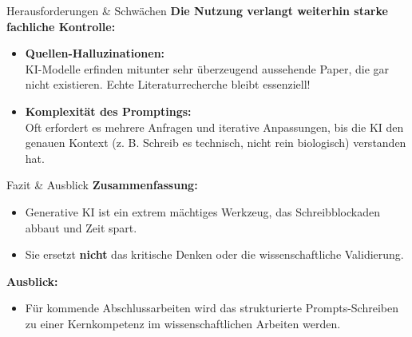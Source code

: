 \documentclass[11pt]{beamer}
\begin{document}
\begin{frame}{Herausforderungen \& Schwächen}
    \textbf{Die Nutzung verlangt weiterhin starke fachliche Kontrolle:}
    \vspace{0.3cm}
    \begin{itemize}
        \item \textbf{Quellen-Halluzinationen:} \\
              KI-Modelle erfinden mitunter sehr überzeugend aussehende Paper, die gar nicht existieren. Echte Literaturrecherche bleibt essenziell!
        \item \textbf{Komplexität des Promptings:} \\
              Oft erfordert es mehrere Anfragen und iterative Anpassungen, bis die KI den genauen Kontext (z. B. Schreib es technisch, nicht rein biologisch) verstanden hat.
    \end{itemize}
\end{frame}

\begin{frame}{Fazit \& Ausblick}
    \textbf{Zusammenfassung:}
    \begin{itemize}
        \item Generative KI ist ein extrem mächtiges Werkzeug, das Schreibblockaden abbaut und Zeit spart.
        \item Sie ersetzt \textbf{nicht} das kritische Denken oder die wissenschaftliche Validierung.
    \end{itemize}
    \vspace{0.5cm}
    \textbf{Ausblick:}
    \begin{itemize}
        \item Für kommende Abschlussarbeiten wird das strukturierte Prompts-Schreiben zu einer Kernkompetenz im wissenschaftlichen Arbeiten werden.
    \end{itemize}
\end{frame}
\end{document}

